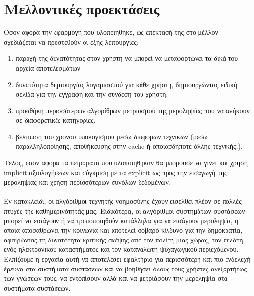 \section{Μελλοντικές προεκτάσεις}
\noindent Όσον αφορά την εφαρμογή που υλοποιήθηκε, ως επέκτασή της στο μέλλον σχεδιάζεται να προστεθούν οι εξής λειτουργίες:\begin{enumerate}
	\item παροχή της δυνατότητας στον χρήστη να μπορεί να μεταφορτώνει τα δικά του αρχεία αποτελεσμάτων
	\item δυνατότητα δημιουργίας λογαριασμού για κάθε χρήστη, δημιουργώντας ειδική σελίδα για την εγγραφή και την σύνδεση του χρήστη.
	\item προσθήκη περισσότερων αλγορίθμων μετριασμού της μεροληψίας που να ανήκουν σε διαφορετικές κατηγορίες.
	\item βελτίωση του χρόνου υπολογισμού μέσω διάφορων τεχνικών (μέσω παραλληλοποίησης, αποθήκευσης στην cache ή οποιασδήποτε άλλης τεχνικής.).
\end{enumerate}
 Τέλος, όσον αφορά τα πειράματα που υλοποιήθηκαν θα μπορούσε να γίνει και χρήση implicit αξιολογήσεων και σύγκριση με τα explicit ως προς την εισαγωγή της μεροληψίας και χρήση περισσότερων συνόλων δεδομένων.\\\\
\noindent Εν κατακλείδι, οι αλγόριθμοι τεχνητής νοημοσύνης έχουν εισέλθει πλέον σε πολλές πτυχές της καθημερινότητάς μας. Ειδικότερα, οι αλγόριθμοι συστημάτων συστάσεων μπορεί να εισάγουν ή να τροποποιηθούν κατάλληλα για να εισάγουν μεροληψία, η οποία αποσαθρώνει την κοινωνία και αποτελεί σοβαρό κίνδυνο για την δημοκρατία, αφαιρώντας τη δυνατότητα κριτικής σκέψης από τον πολίτη μιας χώρας, τον πελάτη ενός ηλεκτρονικού καταστήματος και τον καταναλωτή ψυχαγωγικού περιεχόμενου. Ελπίζουμε η εργασία αυτή να αποτελέσει εφαλτήριο για περισσότερη και πιο ενδελεχή έρευνα στα συστήματα συστάσεων και να βοηθήσει όλους τους χρήστες ανεξαρτήτως των γνώσεών τους, να εντοπίσουν αλλά και να μετριάσουν την μεροληψία στα συστήματα συστάσεων.
